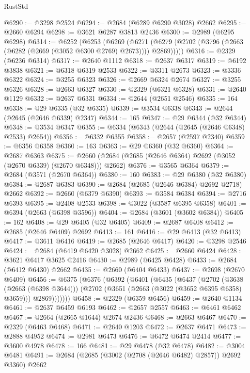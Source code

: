 \begin{lexlean}{RustStd}
\begin{coremodule}
@6290 := @3298 @2524
@6294 := @2684 (@6289 @6290 @3028) @2662
@6295 := @2660 @6294
@6298 := @3621 @6287 @3813 @2436
@6300 := @2989 (@6295 @6298)
@6314 := @6252
    (@6253
      (@6269
        (@6271 (@6279 (@2702 (@3796 (@2663 (@6282 (@2669 (@3052 @6300 @2769) @2673)))) @2869)))))
@6316 := @2329 (@6236 @6314)
@6317 := @2640 @1112
@6318 := @2637 @6317
@6319 := @6192 @3838
@6321 := @6318 @6319 @2533
@6322 := @3311 @2673
@6323 := @3336 @6322
@6324 := @3255 @6323
@6326 := @2669 @6324 @2674
@6327 := @3255 @6326
@6328 := @2663 @6327
@6330 := @2329 (@6321 @6328)
@6331 := @2640 @1129
@6332 := @2637 @6331
@6334 := @2644 (@2651 @2546)
@6335 := 164
@6338 := @29 @6335 (@32 @6335)
@6339 := @3534 @6338
@6343 := @2644 (@2645 (@2646 @6339) @2347)
@6344 := 165
@6347 := @29 @6344 (@32 @6344)
@6348 := @3534 @6347
@6355 := @6334 (@6343 (@2644 (@2645 (@2646 @6348) @2533) @2654))
@6356 := @6332 @6355
@6358 := @2657 (@2597 @2340)
@6359 := @6356 @6358
@6360 := 163
@6363 := @29 @6360 (@32 @6360)
@6364 := @2687 @6363
@6375 := @2660 (@2684 (@2685 (@2646 @6364) @2692 (@3052 (@2670 @6339) (@2670 @6348))) @2662)
@6376 := @3565 @6364
@6379 := @2684 (@3571 (@2670 @6364))
@6380 := 160
@6383 := @29 @6380 (@32 @6380)
@6384 := @2687 @6383
@6390 := @2684 (@2685 (@2646 @6384) @2692 @2718) @2662
@6392 := @2660 (@6379 @6390)
@6393 := @3584 @6384
@6394 := @2716 @6393
@6395 := @2408 @2533
@6398 := @3022 (@3587 @6395 @6358)
@6401 := @6394 (@2663 (@6398 @3596))
@6404 := @2684 (@3601 (@3602 @6384))
@6405 := 162
@6408 := @29 @6405 (@32 @6405)
@6409 := @2687 @6408
@6412 := @2685 (@2646 @6409) @2692
@6413 := 161
@6416 := @29 @6413 (@32 @6413)
@6417 := @3611 @6416
@6419 := @2685 (@2646 @6417)
@6420 := @3298 @2546
@6424 := @2684 (@6419 @6420 @3028) @2662
@6425 := @2660 @6424
@6428 := @3621 @6417 @3625 @2416
@6430 := @2989 (@6425 @6428)
@6433 := @2684 (@6412 @6430) @2662
@6435 := @2660 (@6404 @6433)
@6437 := @2698 (@2670 @6409)
@6456 := @6375
    (@6376
      (@6392
        (@6401
          (@6435
            (@6437
              (@2702
                (@3638 (@2663 (@6398 @3644)))
                (@2702 (@3651 (@2663 (@3022 (@3652 @6395 @6358) @3659))) @2869)))))))
@6458 := @2329 (@6359 @6456)
@6459 := @2640 @1134
@6461 := @2637 @6459 @6193
@6462 := @2657 @2557
@6463 := @6461 @6462
@6467 := @2664 (@2665 @1644) @2674 @2436
@6468 := @2663 @6467
@6470 := @2329 (@6463 @6468)
@6471 := @2640 @1203
@6472 := @2637 @6471
@6473 := @2888 @4952
@6474 := @2981 @6473
@6476 := @6472 @6474 @2414
@6477 := @3600 @4978
@6478 := 166
@6481 := @29 @6478 (@32 @6478)
@6482 := @3004 @6481
@6491 := @2684 (@2685 (@3002 (@2708 (@2646 @6482) @2857)) @2692 @3360) @2662

\end{coremodule}
\end{lexlean}
